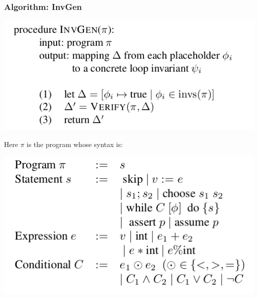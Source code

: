 \documentclass[11pt]{beamer}
\begin{document}
\begin{frame}\frametitle{Algorithm: InvGen}

\begin{center}
\includegraphics[scale=0.4]{main.png}
\end{center}
Here $\pi$ is the program whose syntax is:
\begin{center}

\includegraphics[scale=0.4]{prog.png}

\end{center}

\end{frame}
\end{document}
